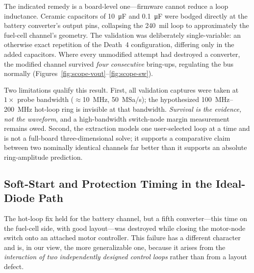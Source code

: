 
The indicated remedy is a board-level one---firmware cannot reduce a loop
inductance. Ceramic capacitors of \SI{10}{\micro\farad} and \SI{0.1}{\micro\farad}
were bodged directly at the battery converter's output pins, collapsing the
\SI{240}{mil} loop to approximately the fuel-cell channel's geometry. The
validation was deliberately single-variable: an otherwise exact repetition of the
Death~4 configuration, differing only in the added capacitors. Where every
unmodified attempt had destroyed a converter, the modified channel survived
\emph{four consecutive} bring-ups, regulating the bus normally
(Figures~\ref{fig:scope-vout}--\ref{fig:scope-sw}).

Two limitations qualify this result. First, all validation captures were taken at
$1\times$ probe bandwidth ($\approx$\SI{10}{\mega\hertz}, \SI{50}{MSa/s}); the
hypothesized \SIrange{100}{200}{\mega\hertz} hot-loop ring is invisible at that
bandwidth. \emph{Survival is the evidence, not the waveform}, and a high-bandwidth
switch-node margin measurement remains owed. Second, the extraction models one
user-selected loop at a time and is not a full-board three-dimensional solve; it
supports a comparative claim between two nominally identical channels far better
than it supports an absolute ring-amplitude prediction.

\subsection{Soft-Start and Protection Timing in the Ideal-Diode Path}
\label{sec:bringup:softstart}


The hot-loop fix held for the battery channel, but a fifth converter---this time
on the fuel-cell side, with good layout---was destroyed while closing the motor-node
switch onto an attached motor controller. This failure has a different character
and is, in our view, the more generalizable one, because it arises from the
\emph{interaction of two independently designed control loops} rather than from a
layout defect.

